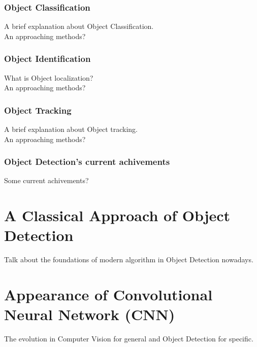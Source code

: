 \documentclass[12pt]{report}
\begin{document}
\subsection{Object Classification}
A brief explanation about Object Classification. \\
An approaching methods?

\subsection{Object Identification}
What is Object localization? \\
An approaching methods?

\subsection{Object Tracking}
A brief explanation about Object tracking. \\
An approaching methods?

\subsection{Object Detection's current achivements}
Some current achivements?


\chapter{A Classical Approach of Object Detection}
Talk about the foundations of modern algorithm in Object Detection nowadays.

\newpage


\chapter{Appearance of Convolutional Neural Network (CNN)}
The evolution in Computer Vision for general and Object Detection for specific.

\newpage

\end{document}
